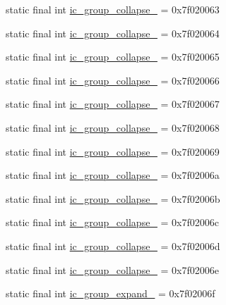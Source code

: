 \begin{CompactItemize}
static final int \hyperlink{classandroid_1_1support_1_1v7_1_1appcompat_1_1_r_1_1drawable_2361684a95e4f8b9216e62c5d7e27cbf}{ic\_\-group\_\-collapse\_} = 0x7f020063
\item 
static final int \hyperlink{classandroid_1_1support_1_1v7_1_1appcompat_1_1_r_1_1drawable_e60c1b13420dd0e14313651f6c0a14da}{ic\_\-group\_\-collapse\_} = 0x7f020064
\item 
static final int \hyperlink{classandroid_1_1support_1_1v7_1_1appcompat_1_1_r_1_1drawable_d2bae7fe6f0afb91bc3b2f876a3ad3ac}{ic\_\-group\_\-collapse\_} = 0x7f020065
\item 
static final int \hyperlink{classandroid_1_1support_1_1v7_1_1appcompat_1_1_r_1_1drawable_96c04b389139305720d47dd7a9d789f5}{ic\_\-group\_\-collapse\_} = 0x7f020066
\item 
static final int \hyperlink{classandroid_1_1support_1_1v7_1_1appcompat_1_1_r_1_1drawable_a1ada841c1a6058307ef06dc31b6fd80}{ic\_\-group\_\-collapse\_} = 0x7f020067
\item 
static final int \hyperlink{classandroid_1_1support_1_1v7_1_1appcompat_1_1_r_1_1drawable_d8e2dba617a1aa6cb5dd62356dd25125}{ic\_\-group\_\-collapse\_} = 0x7f020068
\item 
static final int \hyperlink{classandroid_1_1support_1_1v7_1_1appcompat_1_1_r_1_1drawable_5375179ce603456c54e7c0fdd86db0f8}{ic\_\-group\_\-collapse\_} = 0x7f020069
\item 
static final int \hyperlink{classandroid_1_1support_1_1v7_1_1appcompat_1_1_r_1_1drawable_e97fcd1c789cfb20da2a86f51c15eb94}{ic\_\-group\_\-collapse\_} = 0x7f02006a
\item 
static final int \hyperlink{classandroid_1_1support_1_1v7_1_1appcompat_1_1_r_1_1drawable_dd8701d03a868121f90795730e5cd25c}{ic\_\-group\_\-collapse\_} = 0x7f02006b
\item 
static final int \hyperlink{classandroid_1_1support_1_1v7_1_1appcompat_1_1_r_1_1drawable_8100694e9bf37d01632ac88011902211}{ic\_\-group\_\-collapse\_} = 0x7f02006c
\item 
static final int \hyperlink{classandroid_1_1support_1_1v7_1_1appcompat_1_1_r_1_1drawable_1f252610680e03ed7246f465be562201}{ic\_\-group\_\-collapse\_} = 0x7f02006d
\item 
static final int \hyperlink{classandroid_1_1support_1_1v7_1_1appcompat_1_1_r_1_1drawable_e0009d2616c6c6ee787d1d35eb9ddf49}{ic\_\-group\_\-collapse\_} = 0x7f02006e
\item 
static final int \hyperlink{classandroid_1_1support_1_1v7_1_1appcompat_1_1_r_1_1drawable_2fdfc61ac25060aa71032111f08e13b1}{ic\_\-group\_\-expand\_} = 0x7f02006f

\end{CompactItemize}
